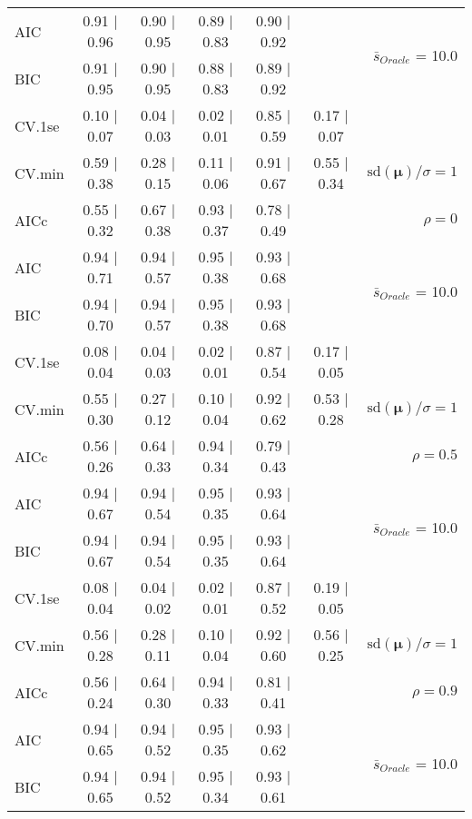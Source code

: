 \begin{table}
\begin{center}
\begin{tabular}{l*{5}{c}|r}
AIC & 0.91 $\mid$ 0.96 & 0.90 $\mid$ 0.95 & 0.89 $\mid$ 0.83 & 0.90 $\mid$ 0.92 & &  \multirow{2}{*}{$\bar{s}_{Oracle}$ = 10.0} \\
BIC & 0.91 $\mid$ 0.95 & 0.90 $\mid$ 0.95 & 0.88 $\mid$ 0.83 & 0.89 $\mid$ 0.92 & &  \\
 \hline 
CV.1se & 0.10 $\mid$ 0.07 & 0.04 $\mid$ 0.03 & 0.02 $\mid$ 0.01 & 0.85 $\mid$ 0.59 & 0.17 $\mid$ 0.07 & \\
CV.min & 0.59 $\mid$ 0.38 & 0.28 $\mid$ 0.15 & 0.11 $\mid$ 0.06 & 0.91 $\mid$ 0.67 & 0.55 $\mid$ 0.34 &  $\mathrm{sd}(\mathbf{\mu})/\sigma=1$ \\
AICc & 0.55 $\mid$ 0.32 & 0.67 $\mid$ 0.38 & 0.93 $\mid$ 0.37 & 0.78 $\mid$ 0.49 & & $\rho=0$ \\
AIC & 0.94 $\mid$ 0.71 & 0.94 $\mid$ 0.57 & 0.95 $\mid$ 0.38 & 0.93 $\mid$ 0.68 & &  \multirow{2}{*}{$\bar{s}_{Oracle}$ = 10.0} \\
BIC & 0.94 $\mid$ 0.70 & 0.94 $\mid$ 0.57 & 0.95 $\mid$ 0.38 & 0.93 $\mid$ 0.68 & &  \\
 \hline 
CV.1se & 0.08 $\mid$ 0.04 & 0.04 $\mid$ 0.03 & 0.02 $\mid$ 0.01 & 0.87 $\mid$ 0.54 & 0.17 $\mid$ 0.05 & \\
CV.min & 0.55 $\mid$ 0.30 & 0.27 $\mid$ 0.12 & 0.10 $\mid$ 0.04 & 0.92 $\mid$ 0.62 & 0.53 $\mid$ 0.28 &  $\mathrm{sd}(\mathbf{\mu})/\sigma=1$ \\
AICc & 0.56 $\mid$ 0.26 & 0.64 $\mid$ 0.33 & 0.94 $\mid$ 0.34 & 0.79 $\mid$ 0.43 & & $\rho=0.5$ \\
AIC & 0.94 $\mid$ 0.67 & 0.94 $\mid$ 0.54 & 0.95 $\mid$ 0.35 & 0.93 $\mid$ 0.64 & &  \multirow{2}{*}{$\bar{s}_{Oracle}$ = 10.0} \\
BIC & 0.94 $\mid$ 0.67 & 0.94 $\mid$ 0.54 & 0.95 $\mid$ 0.35 & 0.93 $\mid$ 0.64 & &  \\
 \hline 
CV.1se & 0.08 $\mid$ 0.04 & 0.04 $\mid$ 0.02 & 0.02 $\mid$ 0.01 & 0.87 $\mid$ 0.52 & 0.19 $\mid$ 0.05 & \\
CV.min & 0.56 $\mid$ 0.28 & 0.28 $\mid$ 0.11 & 0.10 $\mid$ 0.04 & 0.92 $\mid$ 0.60 & 0.56 $\mid$ 0.25 &  $\mathrm{sd}(\mathbf{\mu})/\sigma=1$ \\
AICc & 0.56 $\mid$ 0.24 & 0.64 $\mid$ 0.30 & 0.94 $\mid$ 0.33 & 0.81 $\mid$ 0.41 & & $\rho=0.9$ \\
AIC & 0.94 $\mid$ 0.65 & 0.94 $\mid$ 0.52 & 0.95 $\mid$ 0.35 & 0.93 $\mid$ 0.62 & &  \multirow{2}{*}{$\bar{s}_{Oracle}$ = 10.0} \\
BIC & 0.94 $\mid$ 0.65 & 0.94 $\mid$ 0.52 & 0.95 $\mid$ 0.34 & 0.93 $\mid$ 0.61 & &  \\

\end{tabular}
\end{center}
\end{table}
